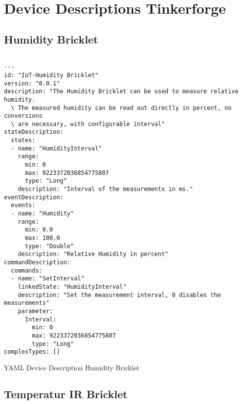 \chapter{Device Descriptions Tinkerforge}
\label{app:device_descriptions}

\section{Humidity Bricklet}

\begin{listing}[H]
\begin{verbatim}

---
id: "IoT-Humidity Bricklet"
version: "0.0.1"
description: "The Humidity Bricklet can be used to measure relative humidity. 
  \ The measured humidity can be read out directly in percent, no conversions 
  \ are necessary, with configurable interval"
stateDescription:
  states:
  - name: "HumidityInterval"
    range:
      min: 0
      max: 9223372036854775807
      type: "Long"
    description: "Interval of the measurements in ms."
eventDescription:
  events:
  - name: "Humidity"
    range:
      min: 0.0
      max: 100.0
      type: "Double"
    description: "Relative Humidity in percent"
commandDescription:
  commands:
  - name: "SetInterval"
    linkedState: "HumidityInterval"
    description: "Set the measurement interval, 0 disables the measurements"
    parameter:
      Interval:
        min: 0
        max: 9223372036854775807
        type: "Long"
complexTypes: []

\end{verbatim}
\caption{YAML Device Description Humidity Bricklet}
\end{listing}




\section{Temperatur IR Bricklet}

